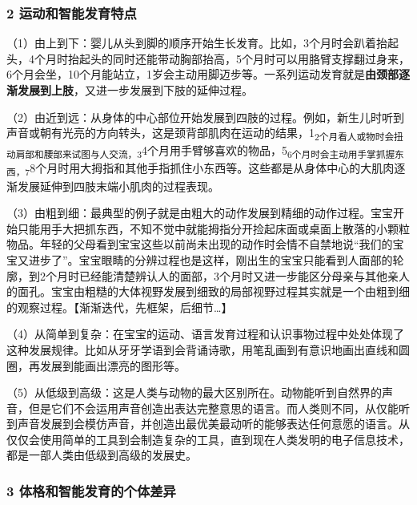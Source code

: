 \documentclass[
]{article}
\begin{document}
\hypertarget{ux8fd0ux52a8ux548cux667aux80fdux53d1ux80b2ux7279ux70b9}{%
\subsubsection{2
运动和智能发育特点}\label{ux8fd0ux52a8ux548cux667aux80fdux53d1ux80b2ux7279ux70b9}}

（1）由上到下：婴儿从头到脚的顺序开始生长发育。比如，3个月时会趴着抬起头，4个月时抬起头的同时还能带动胸部抬高，5个月时可以用胳臂支撑翻过身来，6个月会坐，10个月能站立，1岁会主动用脚迈步等。一系列运动发育就是\textbf{由颈部逐渐发展到上肢}，又进一步发展到下肢的延伸过程。

（2）由近到远：从身体的中心部位开始发展到四肢的过程。例如，新生儿时听到声音或朝有光亮的方向转头，这是颈背部肌肉在运动的结果，1\textsubscript{2个月看人或物时会扭动肩部和腰部来试图与人交流，3}4个月用手臂够喜欢的物品，5\textsubscript{6个月时会主动用手掌抓握东西，7}8个月时用大拇指和其他手指抓住小东西等。这些都是从身体中心的大肌肉逐渐发展延伸到四肢末端小肌肉的过程表现。

（3）由粗到细：最典型的例子就是由粗大的动作发展到精细的动作过程。宝宝开始只能用手大把抓东西，不知不觉中就能拇指分开捡起床面或桌面上散落的小颗粒物品。年轻的父母看到宝宝这些以前尚未出现的动作时会情不自禁地说``我们的宝宝又进步了''。宝宝眼睛的分辨过程也是这样，刚出生的宝宝只能看到人面部的轮廓，到2个月时已经能清楚辨认人的面部，3个月时又进一步能区分母亲与其他亲人的面孔。宝宝由粗糙的大体视野发展到细致的局部视野过程其实就是一个由粗到细的观察过程。【渐渐迭代，先框架，后细节\ldots】

（4）从简单到复杂：在宝宝的运动、语言发育过程和认识事物过程中处处体现了这种发展规律。比如从牙牙学语到会背诵诗歌，用笔乱画到有意识地画出直线和圆圈，再发展到能画出漂亮的图形等。

（5）从低级到高级：这是人类与动物的最大区别所在。动物能听到自然界的声音，但是它们不会运用声音创造出表达完整意思的语言。而人类则不同，从仅能听到声音发展到会模仿声音，并创造出最优美最动听的能够表达任何意愿的语言。从仅仅会使用简单的工具到会制造复杂的工具，直到现在人类发明的电子信息技术，都是一部人类由低级到高级的发展史。

\hypertarget{ux4f53ux683cux548cux667aux80fdux53d1ux80b2ux7684ux4e2aux4f53ux5deeux5f02}{%
\subsubsection{3
体格和智能发育的个体差异}\label{ux4f53ux683cux548cux667aux80fdux53d1ux80b2ux7684ux4e2aux4f53ux5deeux5f02}}
\end{document}
